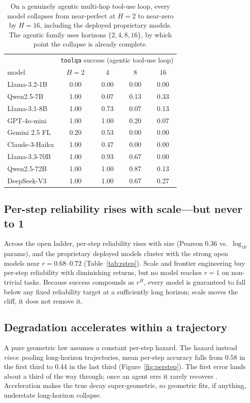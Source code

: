 \documentclass[11pt]{article}
\newcommand{\rstep}{r}
\newcommand{\horizon}{H}
\begin{document}
\begin{table}[t]
\centering\small
\begin{tabular}{lcccc}
\toprule
& \multicolumn{4}{c}{\texttt{toolqa} success (agentic tool-use loop)} \\
model & $H{=}2$ & $4$ & $8$ & $16$ \\
\midrule
Llama-3.2-1B   & 0.00 & 0.00 & 0.00 & 0.00 \\
Qwen2.5-7B     & 1.00 & 0.07 & 0.13 & 0.33 \\
Llama-3.1-8B   & 1.00 & 0.73 & 0.07 & 0.13 \\
GPT-4o-mini    & 1.00 & 1.00 & 0.20 & 0.07 \\
Gemini 2.5 FL  & 0.20 & 0.53 & 0.00 & 0.00 \\
Claude-3-Haiku & 1.00 & 0.47 & 0.00 & 0.00 \\
Llama-3.3-70B  & 1.00 & 0.93 & 0.67 & 0.00 \\
Qwen2.5-72B    & 1.00 & 1.00 & 0.87 & 0.13 \\
DeepSeek-V3    & 1.00 & 1.00 & 0.67 & 0.27 \\
\bottomrule
\end{tabular}
\caption{On a genuinely agentic multi-hop tool-use loop, every model collapses from
near-perfect at $H{=}2$ to near-zero by $H{=}16$, including the deployed proprietary
models. The agentic family uses horizons $\{2,4,8,16\}$, by which point the collapse is
already complete.}
\label{tab:toolqa}
\end{table}

\subsection{Per-step reliability rises with scale---but never to 1}
Across the open ladder, per-step reliability rises with size (Pearson $0.36$ vs.\
$\log_{10}$ params), and the proprietary deployed models cluster with the strong open
models near $\rstep{=}0.68$--$0.72$ (Table~\ref{tab:rstep}). Scale and frontier
engineering buy per-step reliability with diminishing returns, but no model reaches
$\rstep{=}1$ on non-trivial tasks. Because success compounds as $\rstep^{\horizon}$,
every model is guaranteed to fall below any fixed reliability target at a sufficiently
long horizon; scale moves the cliff, it does not remove it.

\subsection{Degradation accelerates within a trajectory}\label{sec:accel}
A pure geometric law assumes a constant per-step hazard. The hazard instead
\emph{rises}: pooling long-horizon trajectories, mean per-step accuracy falls from
$0.58$ in the first third to $0.44$ in the last third (Figure~\ref{fig:perstep}). The
first error lands about a third of the way through; once an agent errs it rarely
recovers \citep{laban2025lostconv}. Acceleration makes the true decay
super-geometric, so geometric fits, if anything, understate long-horizon collapse.
\end{document}
